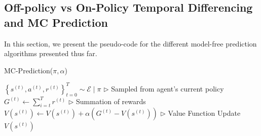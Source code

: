 \documentclass[11pt]{article}
\begin{document}
\subsection{Off-policy vs On-Policy Temporal Differencing and MC Prediction}
In this section, we present the pseudo-code for the different model-free prediction algorithms presented thus far.

\begin{algorithm}[H]
\caption{MC-Prediction($\pi, \alpha$)}
\label{algo:MC}
\begin{algorithmic}[1]
\STATE $\left\{s^{(t)}, a^{(t)}, r^{(t)}\right\}_{t=0}^{T} \sim \mathcal{E} \mid \pi$ \hfill $\triangleright$ Sampled from agent's current policy
\STATE $G^{(t)} \leftarrow \sum_{i=t}^{T} r^{(t)}$  \hfill $\triangleright$ Summation of rewards
\STATE $V\left(s^{(t)}\right) \leftarrow V\left(s^{(t)}\right)+\alpha\left(G^{(t)}-V\left(s^{(t)}\right)\right)$ \hfill $\triangleright$ Value Function Update
\ENDFOR
\ENDFOR
\RETURN{} $V\left(s^{(t)}\right)$
\end{algorithmic}
\end{algorithm}
\end{document}
